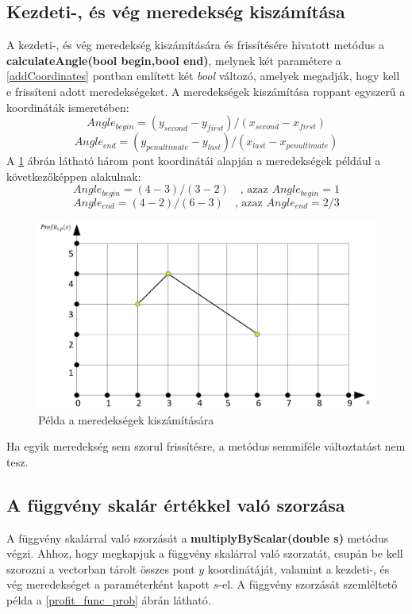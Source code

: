 \subsection{Kezdeti-, és vég meredekség kiszámítása} \label{calculateAngle}
A  kezdeti-, és vég meredekség kiszámítására és frissítésére hivatott metódus a \textbf{calculateAngle(bool begin,bool end)}, melynek két paramétere a \ref{addCoordinates} pontban említett két \textit{bool} változó, amelyek megadják, hogy kell e frissíteni adott meredekségeket. A meredekségek kiszámítása roppant egyszerű a koordináták ismeretében:
$$Angle_{begin}=(y_{second}-y_{first}) / (x_{second}-x_{first})$$
$$Angle_{end}=(y_{penultimate}-y_{last}) / (x_{last}-x_{penultimate})$$
A \ref{calculate angle} ábrán látható három pont koordinátái alapján a meredekségek például a következőképpen alakulnak: 
$$Angle_{begin}=(4-3) / (3-2)\quad \text{, azaz } Angle_{begin}=1$$
$$Angle_{end}=(4-2) / (6-3)\quad \text{, azaz } Angle_{end}=2/3$$
\begin{figure}[H]
\begin{center}
\includegraphics[scale=0.375]{calculate_angle}
\caption{Példa a meredekségek kiszámítására}
\label{calculate angle}
\end{center}
\end{figure}
Ha egyik meredekség sem szorul frissítésre, a metódus semmiféle változtatást nem tesz.
\subsection{A függvény skalár értékkel való szorzása} \label{multiplyByScalar}
A függvény skalárral való szorzását a \textbf{multiplyByScalar(double s)} metódus végzi. Ahhoz, hogy megkapjuk a függvény skalárral való szorzatát, csupán be kell szorozni a vectorban tárolt összes pont $y$ koordinátáját, valamint a kezdeti-, és vég meredekséget a paraméterként kapott $s$-el. A függvény szorzását szemléltető példa a \ref{profit_func_prob} ábrán látható.
